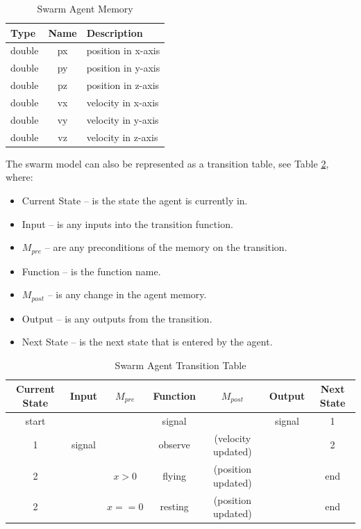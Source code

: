 \begin{table}[ht]
\centering
\begin{tabular}{|l||c||l|}
\hline
Type&Name&Description\\
\hline \hline
double&px&position in x-axis\\
\hline
double&py&position in y-axis\\
\hline
double&pz&position in z-axis\\
\hline
double&vx&velocity in x-axis\\
\hline
double&vy&velocity in y-axis\\
\hline
double&vz&velocity in z-axis\\
\hline
\end{tabular}
\caption{Swarm Agent Memory}
\label{tab:swarm_memory}
\end{table}

The swarm model can also be represented as a transition table, see Table
\ref{tab:swarmtransition}, where:

\begin{itemize}
  \item Current State -- is the state the agent is currently in.
  \item Input -- is any inputs into the transition function.
  \item $M_{pre}$ -- are any preconditions of the memory on the transition.
  \item Function -- is the function name.
  \item $M_{post}$ -- is any change in the agent memory.
  \item Output -- is any outputs from the transition.
  \item Next State -- is the next state that is entered by the agent.
\end{itemize}

\begin{table}[ht]
\centering
\begin{tabular}{|c|c|c||c||c|c|c|}
\hline
Current State&Input&$M_{pre}$&Function&$M_{post}$&Output&Next State\\
\hline
\hline
start&&&signal&&signal&1\\
\hline
1&signal&&observe&(velocity updated)&&2\\
\hline
2&&$x > 0$&flying&(position updated)&&end\\
\hline
2&&$x == 0$&resting&(position updated)&&end\\
\hline
\end{tabular}
\caption{Swarm Agent Transition Table}
\label{tab:swarmtransition}
\end{table}
% 

